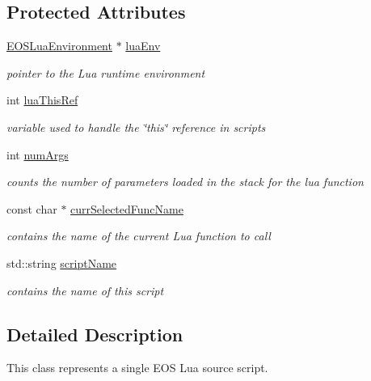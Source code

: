 \subsection*{Protected Attributes}
\begin{CompactItemize}
\item 
\hyperlink{classEOSLuaEnvironment}{EOSLuaEnvironment} $\ast$ \hyperlink{classEOSLuaScript_4417b00b43ee03bc2120f76a3bb12d07}{luaEnv}
\begin{CompactList}\small\item\em pointer to the Lua runtime environment \item\end{CompactList}\item 
int \hyperlink{classEOSLuaScript_6ce277b904132a14459a929d6d8a5903}{luaThisRef}
\begin{CompactList}\small\item\em variable used to handle the \char`\"{}this\char`\"{} reference in scripts \item\end{CompactList}\item 
int \hyperlink{classEOSLuaScript_b86282ecf112d657fd92b29b4e21a40e}{numArgs}
\begin{CompactList}\small\item\em counts the number of parameters loaded in the stack for the lua function \item\end{CompactList}\item 
const char $\ast$ \hyperlink{classEOSLuaScript_f4fddb1fd2af7b266cb7b41f6b50a047}{currSelectedFuncName}
\begin{CompactList}\small\item\em contains the name of the current Lua function to call \item\end{CompactList}\item 
std::string \hyperlink{classEOSLuaScript_7ca6cc5f26c5cfad510e9391e5815d8c}{scriptName}
\begin{CompactList}\small\item\em contains the name of this script \item\end{CompactList}\end{CompactItemize}


\subsection{Detailed Description}
This class represents a single EOS Lua source script. 

